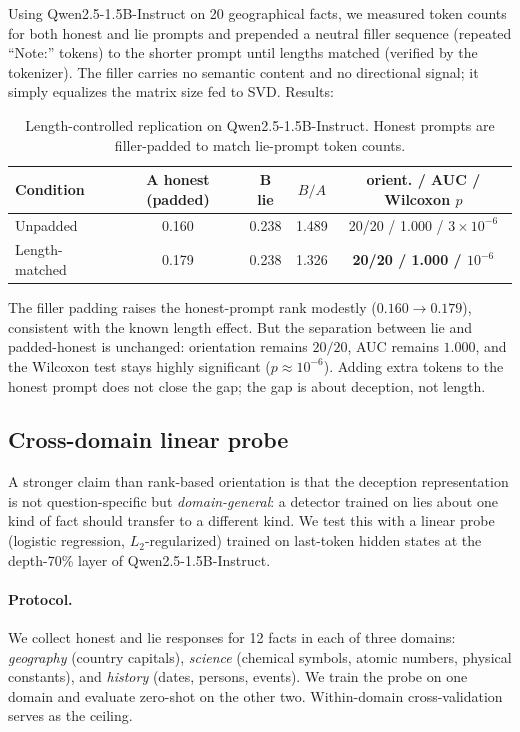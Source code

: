 \documentclass[11pt]{article}
\begin{document}
Using Qwen2.5-1.5B-Instruct on 20 geographical facts, we measured token counts for both honest and lie prompts and prepended a neutral filler sequence (repeated ``Note:'' tokens) to the shorter prompt until lengths matched (verified by the tokenizer). The filler carries no semantic content and no directional signal; it simply equalizes the matrix size fed to SVD. Results:

\begin{table}[h]
\centering
\caption{Length-controlled replication on Qwen2.5-1.5B-Instruct. Honest
prompts are filler-padded to match lie-prompt token counts.}
\label{tab:lengthcontrol}
\begin{tabular}{lcccc}
\toprule
Condition & A honest (padded) & B lie & $B/A$ & orient. / AUC / Wilcoxon $p$\\
\midrule
Unpadded   & 0.160 & 0.238 & 1.489 & 20/20 / 1.000 / $3\!\times\!10^{-6}$\\
Length-matched & 0.179 & 0.238 & 1.326 & \textbf{20/20 / 1.000 / $10^{-6}$}\\
\bottomrule
\end{tabular}
\end{table}

The filler padding raises the honest-prompt rank modestly ($0.160\to0.179$), consistent with the known length effect. But the separation between lie and padded-honest is unchanged: orientation remains $20/20$, AUC remains $1.000$, and the Wilcoxon test stays highly significant ($p\!\approx\!10^{-6}$). Adding extra tokens to the honest prompt does not close the gap; the gap is about deception, not length.

\subsection{Cross-domain linear probe}
\label{sec:probe}

A stronger claim than rank-based orientation is that the deception representation is not question-specific but \emph{domain-general}: a detector trained on lies about one kind of fact should transfer to a different kind. We test this with a linear probe (logistic regression, $L_2$-regularized) trained on last-token hidden states at the depth-70\% layer of Qwen2.5-1.5B-Instruct.

\paragraph{Protocol.} We collect honest and lie responses for 12 facts in each of three domains: \emph{geography} (country capitals), \emph{science} (chemical symbols, atomic numbers, physical constants), and \emph{history} (dates, persons, events). We train the probe on one domain and evaluate zero-shot on the other two. Within-domain cross-validation serves as the ceiling.
\end{document}
